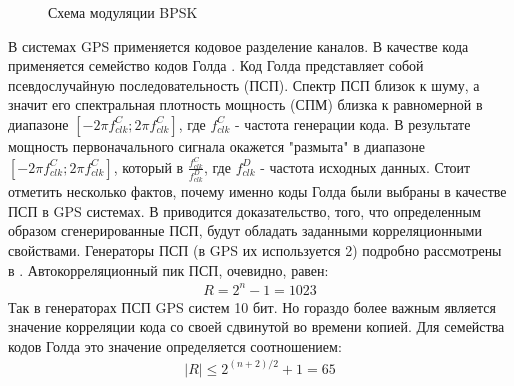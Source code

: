 \documentclass[a4paper,12pt]{article}
\numberwithin{table}{section}
\begin{document}
\begin{figure}[h]
\begin{center}
\end{center}
\caption{Схема модуляции BPSK}
\label{pic:bpsk}
\end{figure}

В системах GPS применяется кодовое разделение каналов. В качестве кода применяется семейство кодов Голда \cite{gold-ieee}.
Код Голда представляет собой псевдослучайную последовательность (ПСП). Спектр ПСП близок к шуму, а значит его
спектральная плотность мощность (СПМ) близка к равномерной в диапазоне ${[-2\pi{f_{clk}^{C}};2\pi{f_{clk}^{C}}]}$, где
${f_{clk}^{C}}$ - частота генерации кода. В результате мощность первоначального сигнала окажется "размыта" в диапазоне 
${[-2\pi{f_{clk}^{C}};2\pi{f_{clk}^{C}}]}$, который в ${\frac{f_{clk}^{C}}{f_{clk}^{D}}}$, где ${f_{clk}^{D}}$ - частота
исходных данных. Стоит отметить несколько фактов, почему именно коды Голда были выбраны в качестве ПСП в GPS системах. 
В \cite{gold-ieee} приводится доказательство, того, что определенным образом сгенерированные ПСП, будут обладать заданными
корреляционными свойствами. Генераторы ПСП (в GPS их используется 2) подробно рассмотрены в \cite{tsui, akos-book}. 
Автокорреляционный пик ПСП, очевидно, равен:
\begin{eqnarray}
	R = 2^n -1 = 1023 
\label{eq:ca_peak}
\end{eqnarray}
Так в генераторах ПСП GPS систем 10 бит. Но гораздо более важным является значение корреляции кода со своей сдвинутой во
времени копией. Для семейства кодов Голда это значение определяется соотношением:
\begin{eqnarray}
	\left|{R}\right| \leq 2^{(n+2)/2} + 1 = 65
\label{eq:ca_peak}
\end{eqnarray}
\end{document}
